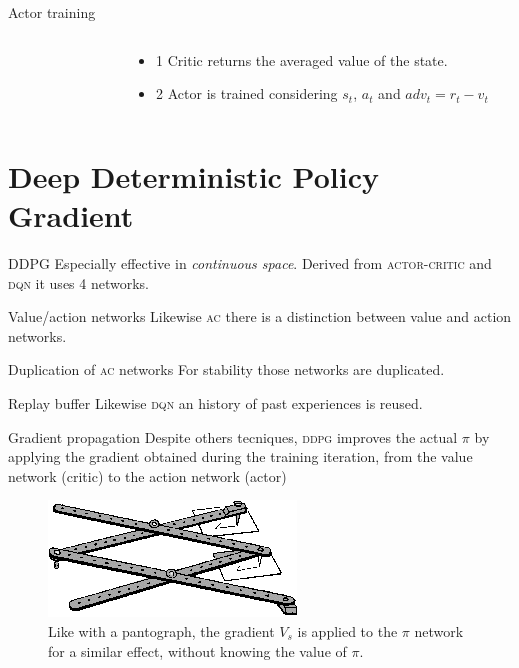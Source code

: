 \documentclass[aspectratio=169]{beamer}
\begin{document}
\begin{frame}{Actor training}
\begin{columns}[c]
\begin{column}{0.5\textwidth}
\begin{figure}
\begin{tikzpicture}[x=0.75pt,y=0.75pt,yscale=-1,xscale=1]
\end{tikzpicture}

		\end{figure}
		\end{column}
		\begin{column}{0.5\textwidth}
			\centering
			\begin{itemize}
				\item\alert{1} Critic returns the averaged value of the state.
				\item\alert{2} Actor is trained considering $s_t$, $a_t$ and $adv_t =r_t-v_t$ 
			\end{itemize}
		\end{column}
		
	\end{columns}

\end{frame}

\section{Deep Deterministic Policy Gradient}
\begin{frame}{DDPG}
	Especially effective in \textit{continuous space}.
	Derived from \textsc{actor-critic} and \textsc{dqn} it uses 4 networks. 
	\begin{alertblock}{Value/action networks}
		Likewise \textsc{ac} there is a distinction between value and action networks.
	\end{alertblock}
	\begin{alertblock}{Duplication of \textsc{ac} networks}
		For stability those networks are duplicated.
	\end{alertblock}	
	\begin{alertblock}{Replay buffer}
		Likewise \textsc{dqn} an history of past experiences is reused.
	\end{alertblock}	
\end{frame}
\begin{frame}{Gradient propagation}
	Despite others tecniques, \textsc{ddpg} improves the actual $\pi$ by applying the gradient obtained during the training iteration, from the value network (critic) to the action network (actor)
	\begin{figure}[t!]	
	\centering
	\includegraphics[scale=2]{img/pantogra.png}
	\caption{Like with a pantograph, the gradient $V_s$ is applied to the $\pi$ network for a similar effect, without knowing the value of $\pi$.}
	\end{figure}
\end{frame}
\end{document}
